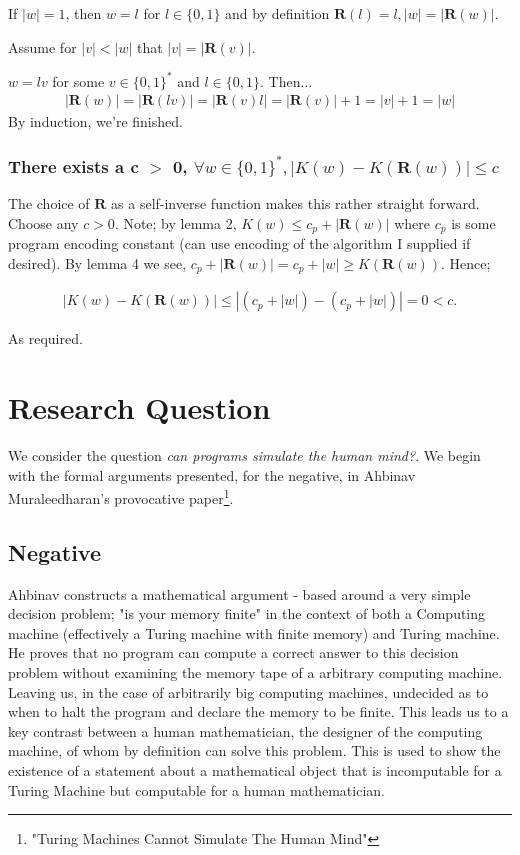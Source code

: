 \documentclass{article}
\begin{document}
If $|w| = 1$, then $w = l$ for $l\in \{0,1\}$ and by definition $\bm{R}(l) = l, |w|=|\bm{R}(w)|$.

Assume for $|v| < |w|$ that $|v| = |\bm{R}(v)|$.

$w = lv$ for some $v \in \{0,1\}^*$ and $l \in \{0,1\}$. Then...
\begin{align*}
	|\bm{R}(w)| = |\bm{R}(lv)| = |\bm{R}(v)l| = |\bm{R}(v)|+1 = |v|+1 = |w|
\end{align*}
By induction, we're finished.

\subsubsection*{There exists a c $>$ 0, $\forall w \in \{0,1\}^*, |K(w) - K(\bm{R}(w))| \leq c$}
The choice of $\bm{R}$ as a self-inverse function makes this rather straight forward. Choose any $c > 0$. Note; by lemma 2, $K(w) \leq c_p + |\bm{R}(w)|$ where $c_p$ is some program encoding constant (can use encoding of the algorithm I supplied if desired). By lemma 4 we see, $c_p + |\bm{R}(w)| = c_p + |w| \geq K(\bm{R}(w))$. Hence;

\begin{align*}
	|K(w) - K(\bm{R}(w))| \leq |(c_p + |w|) - (c_p + |w|)| = 0 < c.
\end{align*}

As required.

\pagebreak
\section*{Research Question}
We consider the question \emph{can programs simulate the human mind?}. We begin with the formal arguments presented, for the negative, in Ahbinav Muraleedharan's provocative paper\footnote{"Turing Machines Cannot Simulate The Human Mind"}.

\subsection*{Negative}
Ahbinav constructs a mathematical argument - based around a very simple decision problem; "is your memory finite" in the context of both a Computing machine (effectively a Turing machine with finite memory) and Turing machine. He proves that no program can compute a correct answer to this decision problem without examining the memory tape of a arbitrary computing machine.\cite{ahbinav} Leaving us, in the case of arbitrarily big computing machines, undecided as to when to halt the program and declare the memory to be finite. This leads us to a key contrast between a human mathematician, the designer of the computing machine, of whom by definition can solve this problem. This is used to show the existence of a statement about a mathematical object that is incomputable for a Turing Machine but computable for a human mathematician. 
\end{document}
